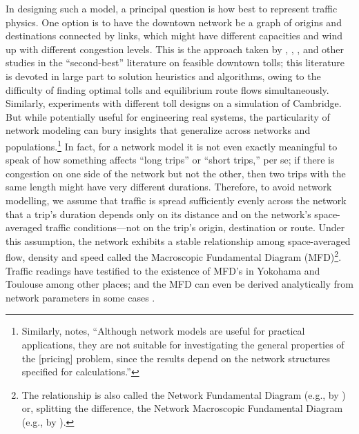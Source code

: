 \documentclass[preprint,authoryear]{elsarticle}
\begin{document}
In designing such a model, a principal question is how best to represent traffic physics. One option is to have the downtown network be a graph of origins and destinations connected by links, which might have different capacities and wind up with different congestion levels. This is the approach taken by \citet{Meng2012}, \citet{Liu2013}, \citet{Verhoef2002b}, \citet{Lawphongpanich2012} and other studies in the ``second-best'' literature on feasible downtown tolls; this literature is devoted in large part to solution heuristics and algorithms, owing to the difficulty of finding optimal tolls and equilibrium route flows simultaneously. Similarly, \citet{May2000} experiments with different toll designs on a simulation of Cambridge. But while potentially useful for engineering real systems, the particularity of network modeling can bury insights that generalize across networks and populations.\footnote{Similarly, \citet{Mun2003} notes, ``Although network models are useful for practical applications, they are not suitable for investigating the general properties of the [pricing] problem, since the results depend on the network structures specified for calculations.''} In fact, for a network model it is not even exactly meaningful to speak of how something affects ``long trips'' or ``short trips,'' per se; if there is congestion on one side of the network but not the other, then two trips with the same length might have very different durations. Therefore, to avoid network modelling, we assume that traffic is spread sufficiently evenly across the network that a trip's duration depends only on its distance and on the network's space-averaged traffic conditions---not on the trip's origin, destination or route. Under this assumption, the network exhibits a stable relationship among space-averaged flow, density and speed called the Macroscopic Fundamental Diagram (MFD)\footnote{The relationship is also called the Network Fundamental Diagram (e.g., by \citet{Mahmassani2013}) or, splitting the difference, the Network Macroscopic Fundamental Diagram (e.g., by \citet{Laval2017}).}. Traffic readings have testified to the existence of MFD's in Yokohama \citep{Geroliminis2008} and Toulouse \citep{Buisson2009} among other places; and the MFD can even be derived analytically from network parameters in some cases \citep{Daganzo2008a,DaganzoLehe2016}.
\end{document}
